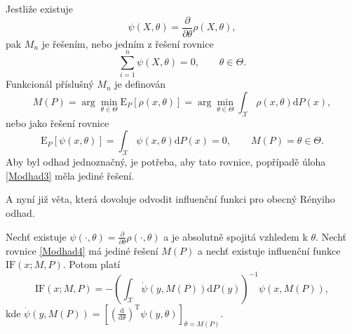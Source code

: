 \noindent Jestliže existuje 
\begin{equation}
	\psi(X,\theta) = \frac{\partial}{\partial \theta} \rho(X,\theta), 
\end{equation}
pak $M_n$ je řešením, nebo jedním z řešení rovnice 
\begin{equation}
	\sum_{i=1}^n \psi(X,\theta) = 0, \qquad \theta \in \Theta.
	\label{Modhad2}
\end{equation}
Funkcionál příslušný $M_n$ je definován 
\begin{equation}
	M(P) = \arg \min_{\theta \in \Theta} \mathrm{E}_{P}\left[ \rho(x,\theta) \right] = \arg \min_{\theta \in \Theta} \int_\mathcal{X} \rho(x,\theta) \mathrm{d}P(x),
	\label{Modhad3}
\end{equation}
nebo jako řešení rovnice 
\begin{equation}
\mathrm{E}_{P}\left[ \psi(x,\theta) \right] =  \int_\mathcal{X} \psi(x,\theta) \mathrm{d}P(x) = 0, \qquad M(P) = \theta \in \Theta.
\label{Modhad4}
\end{equation}
Aby byl odhad jednoznačný, je potřeba, aby tato rovnice, popřípadě úloha \eqref{Modhad3} měla jediné řešení.

A nyní již věta, která dovoluje odvodit influenční funkci pro obecný Rényiho odhad. 
\begin{theorem} 
 Nechť existuje $\psi(\cdot,\theta) =  \frac{\partial}{\partial \theta} \rho(\cdot,\theta)$ a je absolutně spojitá vzhledem k $\theta$. Nech\v{t} rovnice \eqref{Modhad4} má jediné řešení $M(P)$ a nechť existuje influenční funkce $\mathrm{IF}(x;M,P)$. Potom platí
\begin{equation}
 \text{IF}(x;M,P) = -\left(\int_{\mathcal{X}} \dot{\psi} (y,M(P)) \mathrm{d}P(y)\right)^{-1} \psi(x,M(P)),
\end{equation}
kde $\dot{\psi} (y,M(P)) = \left[\left(\frac{\mathrm{d}}{\mathrm{d}\theta}\right)^\mathrm{T}\psi(y,\theta)\right]_{\theta = M(P)}$.
\label{influencni veta}
\end{theorem}


